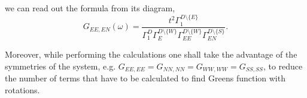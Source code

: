 \documentclass[%
 reprint,
 amsmath,amssymb,
 aps,
prb,
floatfix,
]{revtex4-1}
\begin{document}
we can read out the formula from its diagram,
\begin{equation}
	G_{EE,EN}(\omega) = \frac{
	t^2\Gamma_1^{D \setminus \{E\}}
	}
	{
		\Gamma_1^{D}
		\Gamma_E^{D \setminus \{W\}}
		\Gamma_{EE}^{D \setminus \{W\}}
		\Gamma_{EN}^{D \setminus \{S\}}
	}.
\end{equation}

Moreover, while performing the calculations one shall take the advantage of the symmetries of the system, e.g. $G_{EE,EE} = G_{NN,NN} = G_{WW,WW} = G_{SS,SS}$, to reduce the number of terms that have to be calculated to find Greens function with rotations.



\end{document}
